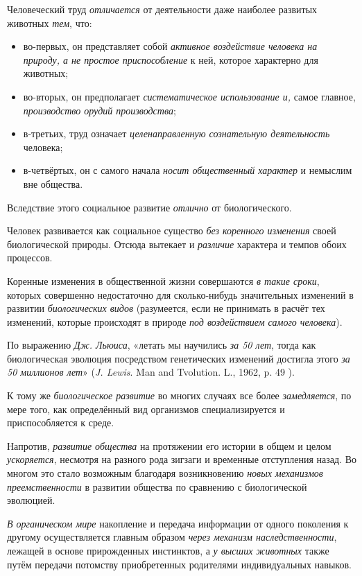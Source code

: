 \documentclass[a4paper,14pt,russian]{extreport}
\begin{document}
Человеческий труд \emph{отличается} от деятельности даже наиболее развитых животных \emph{тем}, что:

\begin{itemize}
\item во-первых, он представляет собой \emph{активное воздействие человека на природу, а не простое приспособление} к ней, которое характерно для животных;
\item во-вторых, он предполагает \emph{систематическое использование и,} самое главное, \emph{производство орудий производства};
\item в-третьих, труд означает \emph{целенаправленную сознательную деятельность} человека;
\item в-четвёртых, он с самого начала \emph{носит общественный характер} и немыслим вне общества.
\end{itemize}

Вследствие этого социальное развитие \emph{отлично} от биологического.

Человек развивается как социальное существо \emph{без коренного изменения} своей биологической природы. Отсюда вытекает и \emph{различие} характера и темпов обоих процессов.

Коренные изменения в общественной жизни совершаются \emph{в такие сроки}, которых совершенно недостаточно для сколько-нибудь значительных изменений в развитии \emph{биологических видов} (разумеется, если не принимать в расчёт тех изменений, которые происходят в природе \emph{под воздействием самого человека}).

По выражению \emph{Дж. Льюиса}, «летать мы научились \emph{за 50 лет}, тогда как биологическая эволюция посредством генетических изменений достигла этого \emph{за 50 миллионов лет}» (\emph{J. Lewis}. Man and Tvolution. L., 1962, p. 49 ).

К тому же \emph{биологическое развитие} во многих случаях все более \emph{замедляется}, по мере того, как определённый вид организмов специализируется и приспособляется к среде.

Напротив, \emph{развитие общества} на протяжении его истории в общем и целом \emph{ускоряется}, несмотря на разного рода зигзаги и временные отступления назад. Во многом это стало возможным благодаря возникновению \emph{новых механизмов преемственности} в развитии общества по сравнению с биологической эволюцией.

\emph{В органическом мире} накопление и передача информации от одного поколения к другому осуществляется главным образом \emph{через механизм наследственности}, лежащей в основе прирожденных инстинктов, а \emph{у высших животных} также путём передачи потомству приобретенных родителями индивидуальных навыков.
\end{document}
